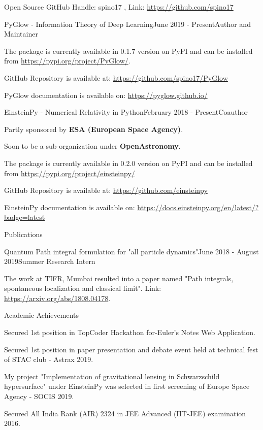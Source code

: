 \documentclass{resume} %
\begin{document}

\begin{rSection}{Open Source}
GitHub Handle: spino17 , Link: \url{https://github.com/spino17} \\
\begin{rSubsection}{PyGlow - Information Theory of Deep Learning}{June 2019 - Present}{Author and Maintainer}{}
\item The package is currently available in 0.1.7 version on PyPI and can be installed from \url{https://pypi.org/project/PyGlow/}.
\item GitHub Repository is available at: \url{https://github.com/spino17/PyGlow}
\item PyGlow documentation is available on: \url{https://pyglow.github.io/}
\end{rSubsection}
\begin{rSubsection}{EinsteinPy - Numerical Relativity in Python}{February 2018 - Present}{Coauthor}{}
\item Partly sponsored by \textbf{ESA (European Space Agency)}.
\item Soon to be a sub-organization under \textbf{OpenAstronomy}.
\item The package is currently available in 0.2.0 version on PyPI and can be installed from  \url{https://pypi.org/project/einsteinpy/}
\item GitHub Repository is available at:
\url{https://github.com/einsteinpy}
\item EinsteinPy documentation is available on:
\url{https://docs.einsteinpy.org/en/latest/?badge=latest}
\end{rSubsection}

\end{rSection}

\begin{rSection}{Publications}

\begin{rSubsection}{Quantum Path integral formulation for "all particle dynamics"}{June 2018 - August 2019}{Summer Research Intern}{}
\item The work at TIFR, Mumbai resulted into a paper named "Path integrals, spontaneous localization and classical limit". Link: \url{https://arxiv.org/abs/1808.04178}.
\end{rSubsection}

\end{rSection}
\newpage
\begin{rSection}{Academic Achievements}
\item Secured 1st position in TopCoder Hackathon for-Euler’s Notes Web Application.
\item Secured 1st position in paper presentation and debate event held at technical fest of STAC club - Astrax 2019.
\item My project "Implementation of gravitational lensing in Schwarzschild hypersurface" under EinsteinPy was selected in first screening of Europe Space Agency - SOCIS 2019.
\item Secured All India Rank (AIR) 2324 in JEE Advanced (IIT-JEE) examination 2016.  
\end{rSection}
\end{document}
